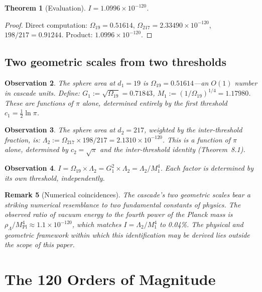 \documentclass[11pt,a4paper]{article}
\newtheorem{theorem}{Theorem}[section]
\newtheorem{remark}[theorem]{Remark}
\newtheorem{observation}[theorem]{Observation}
\begin{document}
\begin{theorem}[Evaluation]
$I = 1.0996\times 10^{-120}$.
\end{theorem}

\begin{proof}
Direct computation: $\Omega_{19} = 0.51614$, $\Omega_{217} = 2.33490\times 10^{-120}$, $198/217 = 0.91244$. Product: $1.0996\times 10^{-120}$.
\end{proof}

\subsection{Two geometric scales from two thresholds}

\begin{observation}
The sphere area at $d_1 = 19$ is $\Omega_{19} = 0.51614$---an $O(1)$ number in cascade units. Define: $G_1 := \sqrt{\Omega_{19}} = 0.71843$, $M_1 := (1/\Omega_{19})^{1/4} = 1.17980$. These are functions of $\pi$ alone, determined entirely by the first threshold $c_1 = \frac{1}{2}\ln\pi$.
\end{observation}

\begin{observation}
The sphere area at $d_2 = 217$, weighted by the inter-threshold fraction, is: $\Lambda_2 := \Omega_{217}\times 198/217 = 2.1310\times 10^{-120}$. This is a function of $\pi$ alone, determined by $c_2 = \sqrt{\pi}$ and the inter-threshold identity (Theorem~8.1).
\end{observation}

\begin{observation}
$I = \Omega_{19}\times\Lambda_2 = G_1^2\times\Lambda_2 = \Lambda_2/M_1^4$. Each factor is determined by its own threshold, independently.
\end{observation}

\begin{remark}[Numerical coincidences]
The cascade's two geometric scales bear a striking numerical resemblance to two fundamental constants of physics. The observed ratio of vacuum energy to the fourth power of the Planck mass is $\rho_\Lambda/M^4_{\mathrm{Pl}}\approx 1.1\times 10^{-120}$, which matches $I = \Lambda_2/M_1^4$ to 0.04\%. The physical and geometric framework within which this identification may be derived lies outside the scope of this paper.
\end{remark}

\section{The 120 Orders of Magnitude}
\end{document}
